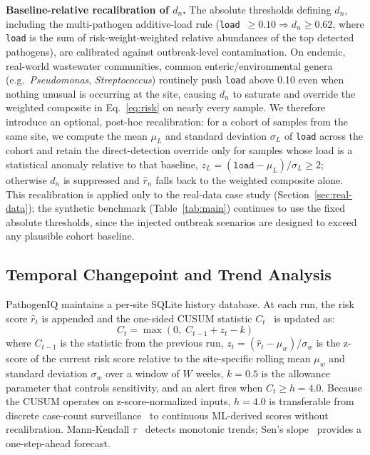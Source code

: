 \documentclass[conference]{IEEEtran}
\begin{document}
\textbf{Baseline-relative recalibration of $d_n$.} The absolute
thresholds defining $d_n$, including the multi-pathogen
additive-load rule (\texttt{load}~$\geq 0.10 \Rightarrow d_n \geq
0.62$, where \texttt{load} is the sum of risk-weight-weighted relative
abundances of the top detected pathogens), are calibrated against
outbreak-level contamination. On endemic, real-world wastewater
communities, common enteric/environmental genera (e.g.\
\textit{Pseudomonas}, \textit{Streptococcus}) routinely push
\texttt{load} above 0.10 even when nothing unusual is occurring at the
site, causing $d_n$ to saturate and override the weighted composite in
Eq.~\ref{eq:risk} on nearly every sample. We therefore introduce an
optional, post-hoc recalibration: for a cohort of samples from the same
site, we compute the mean $\mu_L$ and standard deviation $\sigma_L$ of
\texttt{load} across the cohort and retain the direct-detection
override only for samples whose load is a statistical anomaly relative
to that baseline, $z_L=(\texttt{load}-\mu_L)/\sigma_L \geq 2$;
otherwise $d_n$ is suppressed and $\hat{r}_n$ falls back to the
weighted composite alone. This recalibration is applied only to the
real-data case study (Section~\ref{sec:real-data}); the synthetic
benchmark (Table~\ref{tab:main}) continues to use
the fixed absolute thresholds, since the injected outbreak scenarios
are designed to exceed any plausible cohort baseline.

\subsection{Temporal Changepoint and Trend Analysis}

PathogenIQ maintains a per-site SQLite history database. At each run,
the risk score $\hat{r}_t$ is appended and the one-sided CUSUM
statistic $C_t$~\cite{Page1954} is updated as:
%
\begin{equation}
C_t = \max(0,\; C_{t-1} + z_t - k)
\label{eq:cusum}
\end{equation}
%
where $C_{t-1}$ is the statistic from the previous run,
$z_t = (\hat{r}_t - \mu_w)/\sigma_w$ is the z-score of the current
risk score relative to the site-specific rolling mean $\mu_w$ and
standard deviation $\sigma_w$ over a window of $W$ weeks,
$k=0.5$ is the allowance parameter that controls sensitivity, and
an alert fires when $C_t \geq h=4.0$.
Because the CUSUM operates on z-score-normalized inputs, $h=4.0$ is
transferable from discrete case-count surveillance~\cite{Farrington1996}
to continuous ML-derived scores without recalibration.
Mann-Kendall $\tau$~\cite{Mann1945,Kendall1975} detects monotonic trends;
Sen's slope~\cite{Sen1968} provides a one-step-ahead forecast.
\end{document}
